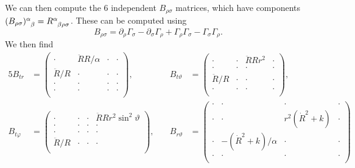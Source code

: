 \documentclass[fleqn]{NotesClass}
\begin{document}
    We can then compute the 6 independent \(B_{\rho\sigma}\) matrices, which have components \(\tensor{(B_{\rho\sigma})}{^\alpha_\beta} = \tensor{R}{^\alpha_{\beta\rho\sigma}}\).
    These can be computed using
    \begin{equation}
        B_{\rho\sigma} = \partial_\rho\Gamma_\sigma - \partial_\sigma\Gamma_\rho + \Gamma_\rho\Gamma_\sigma - \Gamma_\sigma\Gamma_\rho.
    \end{equation}
    We then find
    \begingroup
    \scriptsize
    \begin{alignat*}{5}
        B_{tr} &= 
        \begin{pmatrix}
            \cdot & \ddot{R}R/\alpha & \cdot & \cdot\\
            \ddot{R}/R & \cdot & \cdot & \cdot\\
            \cdot & \cdot & \cdot & \cdot\\
            \cdot & \cdot & \cdot & \cdot\\
        \end{pmatrix}
        , \quad & B_{t\vartheta} &= 
        \begin{pmatrix}
            \cdot & \cdot & \ddot{R}Rr^2 & \cdot\\
            \cdot & \cdot & \cdot & \cdot\\
            \ddot{R}/R & \cdot & \cdot & \cdot\\
            \cdot & \cdot & \cdot & \cdot\\
        \end{pmatrix}
        ,\\
        B_{t\varphi} &= 
        \begin{pmatrix}
            \cdot & \cdot & \cdot & \ddot{R}Rr^2\sin^2\vartheta\\
            \cdot & \cdot & \cdot & \cdot\\
            \cdot & \cdot & \cdot & \cdot\\
            \ddot{R}/R & \cdot & \cdot & \cdot\\
        \end{pmatrix}
        , \quad & B_{r\vartheta} &=
        \begin{pmatrix}
            \cdot & \cdot & \cdot & \cdot\\
            \cdot & \cdot & r^2(\dot{R}^2 + k) & \cdot\\
            \cdot & -(\dot{R}^2 + k)/\alpha & \cdot & \cdot\\
            \cdot & \cdot & \cdot & \cdot\\

\end{pmatrix}
\end{alignat*}
\end{document}
